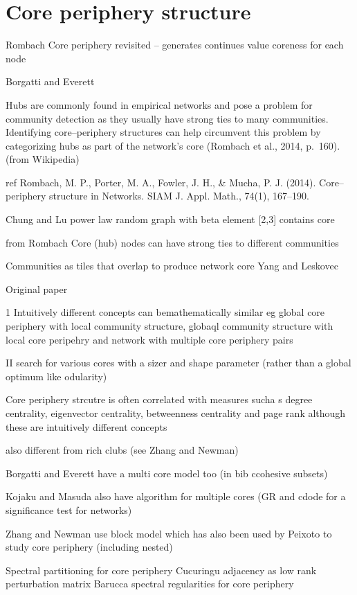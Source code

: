 \chapter{Core periphery structure} 

Rombach Core periphery revisited – generates continues value coreness for each node

Borgatti and Everett

Hubs are commonly found in empirical networks and pose a problem for community detection as they usually have strong ties to many communities. Identifying core–periphery structures can help circumvent this problem by categorizing hubs as part of the network's core (Rombach et al., 2014, p. 160).  (from Wikipedia)

ref Rombach, M. P., Porter, M. A., Fowler, J. H., \& Mucha, P. J. (2014). Core–periphery structure in Networks. SIAM J. Appl. Math., 74(1), 167–190.

Chung and Lu power law random graph with beta element [2,3] contains core

from Rombach
Core (hub) nodes can have strong ties to different communities

Communities as tiles that overlap to produce network core Yang and Leskovec

Original paper

1 Intuitively different concepts can bemathematically similar eg global core periphery with local community structure, globaql community structure with local core peripehry and network with multiple core periphery pairs

II search for various cores with a sizer and shape parameter (rather than a global optimum like odularity)

Core periphery strcutre is often correlated with measures sucha s degree centrality, eigenvector centrality, betweenness centrality and page rank although these are intuitively different concepts

also different from rich clubs (see Zhang and Newman)

Borgatti and Everett have a multi core model too (in bib ccohesive subsets)

Kojaku and Masuda also have algorithm for multiple cores (GR and cdode for a significance test for networks)

Zhang and Newman use block model which has also been used by Peixoto to study core periphery (including nested)

Spectral partitioning for core periphery
Cucuringu adjacency as low rank perturbation matrix
Barucca spectral regularities for core periphery

